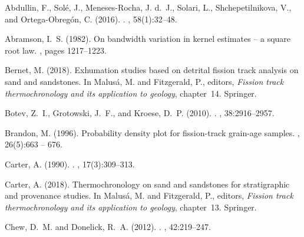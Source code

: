\documentclass{article}
\begin{document}
\begin{thebibliography}{}

Abdullin, F., Sol{\'e}, J., Meneses-Rocha, J. d.~J., Solari, L.,
  Shchepetilnikova, V., and Ortega-Obreg{\'o}n, C. (2016).
.
, 58(1):32--48.

Abramson, I.~S. (1982).
\newblock On bandwidth variation in kernel estimates -- a square root law.
, pages 1217--1223.

Bernet, M. (2018).
\newblock Exhumation studies based on detrital fission track analysis on sand
  and sandstones.
\newblock In Malus\'{a}, M. and Fitzgerald, P., editors, {\em Fission track
  thermochronology and its application to geology}, chapter~14. Springer.

{Botev}, Z.~I., {Grotowski}, J.~F., and {Kroese}, D.~P. (2010).
.
, 38:2916--2957.

Brandon, M. (1996).
\newblock Probability density plot for fission-track grain-age samples.
, 26(5):663 -- 676.

Carter, A. (1990).
.
,
  17(3):309--313.

Carter, A. (2018).
\newblock Thermochronology on sand and sandstones for stratigraphic and
  provenance studies.
\newblock In Malus\'{a}, M. and Fitzgerald, P., editors, {\em Fission track
  thermochronology and its application to geology}, chapter~13. Springer.

Chew, D.~M. and Donelick, R.~A. (2012).
.
,
  42:219--247.


\end{thebibliography}
\end{document}
